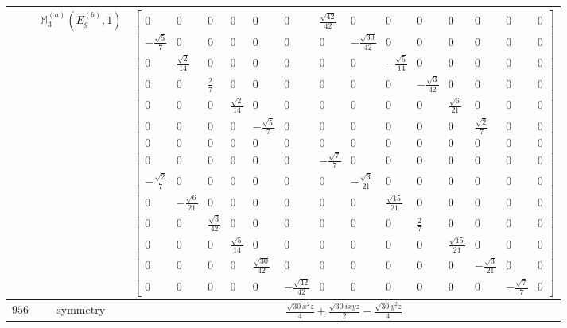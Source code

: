 \documentclass[fleqn,8pt,landscape]{jsarticle}
\begin{document}
\begin{longtable}{ccc}
$  $ & $ \mathbb{M}_{3}^{(a)}(E_{g}^{(b)},1) $ & $ \begin{bmatrix} 0 & 0 & 0 & 0 & 0 & 0 & \frac{\sqrt{42}}{42} & 0 & 0 & 0 & 0 & 0 & 0 & 0 \\ - \frac{\sqrt{5}}{7} & 0 & 0 & 0 & 0 & 0 & 0 & - \frac{\sqrt{30}}{42} & 0 & 0 & 0 & 0 & 0 & 0 \\ 0 & \frac{\sqrt{2}}{14} & 0 & 0 & 0 & 0 & 0 & 0 & - \frac{\sqrt{5}}{14} & 0 & 0 & 0 & 0 & 0 \\ 0 & 0 & \frac{2}{7} & 0 & 0 & 0 & 0 & 0 & 0 & - \frac{\sqrt{3}}{42} & 0 & 0 & 0 & 0 \\ 0 & 0 & 0 & \frac{\sqrt{2}}{14} & 0 & 0 & 0 & 0 & 0 & 0 & \frac{\sqrt{6}}{21} & 0 & 0 & 0 \\ 0 & 0 & 0 & 0 & - \frac{\sqrt{5}}{7} & 0 & 0 & 0 & 0 & 0 & 0 & \frac{\sqrt{2}}{7} & 0 & 0 \\ 0 & 0 & 0 & 0 & 0 & 0 & 0 & 0 & 0 & 0 & 0 & 0 & 0 & 0 \\ 0 & 0 & 0 & 0 & 0 & 0 & - \frac{\sqrt{7}}{7} & 0 & 0 & 0 & 0 & 0 & 0 & 0 \\ - \frac{\sqrt{2}}{7} & 0 & 0 & 0 & 0 & 0 & 0 & - \frac{\sqrt{3}}{21} & 0 & 0 & 0 & 0 & 0 & 0 \\ 0 & - \frac{\sqrt{6}}{21} & 0 & 0 & 0 & 0 & 0 & 0 & \frac{\sqrt{15}}{21} & 0 & 0 & 0 & 0 & 0 \\ 0 & 0 & \frac{\sqrt{3}}{42} & 0 & 0 & 0 & 0 & 0 & 0 & \frac{2}{7} & 0 & 0 & 0 & 0 \\ 0 & 0 & 0 & \frac{\sqrt{5}}{14} & 0 & 0 & 0 & 0 & 0 & 0 & \frac{\sqrt{15}}{21} & 0 & 0 & 0 \\ 0 & 0 & 0 & 0 & \frac{\sqrt{30}}{42} & 0 & 0 & 0 & 0 & 0 & 0 & - \frac{\sqrt{3}}{21} & 0 & 0 \\ 0 & 0 & 0 & 0 & 0 & - \frac{\sqrt{42}}{42} & 0 & 0 & 0 & 0 & 0 & 0 & - \frac{\sqrt{7}}{7} & 0 \end{bmatrix} $ \\ \hline
$ 956 $ & $ \text{symmetry} $ & $ \frac{\sqrt{30} x^{2} z}{4} + \frac{\sqrt{30} i x y z}{2} - \frac{\sqrt{30} y^{2} z}{4} $ \\

\end{longtable}
\end{document}
